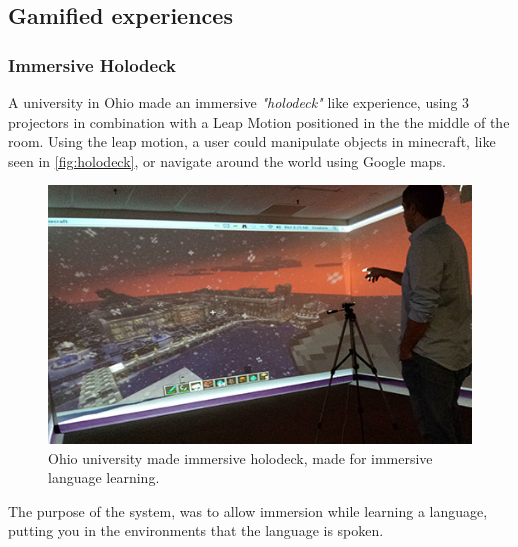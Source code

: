     \subsection{Gamified experiences}
        \subsubsection{Immersive Holodeck}\label{sec:leapMotionHolodeck} %
            A university in Ohio made an immersive \textit{"holodeck"} like experience, using 3 projectors in combination with a Leap Motion positioned in the the middle of the room. Using the leap motion, a user could manipulate objects in minecraft, like seen in \autoref{fig:holodeck}, or navigate around the world using Google maps\cite{leapMotionHolodeck}.
            
            \begin{figure}[H]
            	\centering
            	\includegraphics[width=0.7\linewidth]{figure/Analysis/holodeck.jpg}
            	\caption{Ohio university made immersive holodeck, made for immersive language learning\cite{leapMotionHolodeck}.}
            	\label{fig:holodeck}
            \end{figure}
            
            The purpose of the system, was to allow immersion while learning a language, putting you in the environments that the language is spoken.
    
